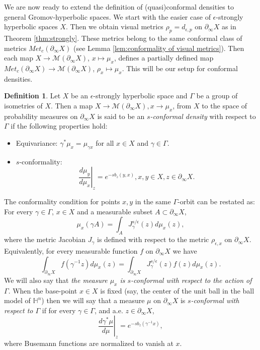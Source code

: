 \documentclass[12pt]{amsbook}%
\theoremstyle{definition}
\newtheorem{defi}[thm]{Definition}
\theoremstyle{remark}
\numberwithin{section}{chapter}
\numberwithin{subsection}{section}
\numberwithin{figure}{chapter}
\def\eps{\epsilon}
\def\bH{{\mathbb{H}}}
\def\cM{{\mathscr{M}}}
\def\Ga{\Gamma}
\def\ga{\gamma}
\def\geo{\partial_\infty}
\def\kap{}
\begin{document}
{{%




\medskip
We are now ready to extend the definition of (quasi)conformal densities to general Gromov-hyperbolic spaces. We start with the easier case of $\eps$-strongly hyperbolic 
spaces $X$. Then we obtain visual metrics $\rho_p=d_{\eps,p}$ on $\geo X$ as  in Theorem \ref{thm:strongly}. These metrics belong to the same conformal class of metrics 
$Met_c(\geo X)$ (see Lemma \ref{lem:conformality of visual metrics}). Then each map $X\to \cM(\geo X)$, $x\mapsto \mu_x$, defines a partially defined map 
$Met_c(\geo X)\to \cM(\geo X)$, $\rho_x\mapsto \mu_x$. This will be our setup for conformal densities.   

 
\begin{defi}\label{def:conformal density}
Let $X$ be an $\eps$-strongly hyperbolic space and $\Ga$ be a group of isometries of $X$. Then a map $X\to \cM(\geo X), x\to \mu_x$, from $X$ to the space of probability measures on $\geo X$ is said to be an {\em $s$-conformal density} with respect to $\Ga$ if the following properties hold:
\begin{itemize}
\item Equivariance: $\ga^*\mu_x=\mu_{\ga x}$ for all $x\in X$ and $\ga\in \Ga$. 

\item $s$-conformality:
$$
\left. \frac{d\mu_y}{d\mu_x}\right\vert_z= e^{-s b_z(y,x)}, x, y\in X, z\in \geo X.
$$ 
\end{itemize}

The conformality condition for points $x, y$ in the same $\Ga$-orbit can be restated as: For every $\ga\in \Ga$, $x\in X$ and a measurable subset $A\subset \geo X$,
$$
\mu_x(\ga A)=\int_A J^{s/\eps}_\ga(z)d\mu_x(z),  
$$   
where the metric Jacobian $J_\ga$ is defined with respect to the metric $\rho_{\eps,x}$ on $\geo X$. 
Equivalently, for every measurable  function $f$ on $\geo X$ we have 
 $$
 \int_{\geo X} f(\ga^{-1}z)d\mu_x(z)= \int_{\geo X} J_\ga^{s/\eps}(z)f(z)d\mu_x(z). 
 $$
 We will also say that {\em the measure $\mu_x$ is $s$-conformal with respect to the action of $\Ga$}. When the base-point $x\in X$ is fixed (say, the center of the unit ball 
 in the ball model of $\bH^n$) then we will say that a measure $\mu$ on $\geo X$ is {\em $s$-conformal with respect to $\Ga$} if for every $\ga\in \Ga$, and a.e. 
$ z\in \geo X$, 
 $$
 \left. \frac{d\ga^*\mu}{d\mu}\right\vert_z= e^{-sb_z(\ga^{-1} x)},  
 $$
 where Busemann functions are normalized to vanish at $x$. 
\end{defi}

}}
\end{document}
